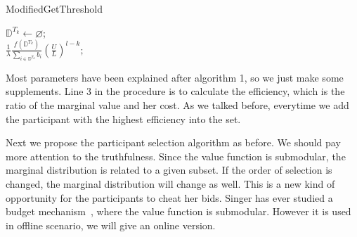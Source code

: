 \documentclass[conference,compsocconf,letterpaper,10pt]{IEEEtran}
\begin{document}
\begin{algorithm}
\BlankLine
{}
\caption{ModifiedGetThreshold}
\label{alg:GetThreshold}
\begin{small}
\BlankLine
$\mathbb{D}^{T_k}\leftarrow\varnothing$;\\
\Return $\frac{1}{\lambda}\frac{f(\mathbb{D}^{T_k})}{\sum_{i\in\mathbb{D}^{T_k}}b_i}\left(\frac{U}{L}\right)^{l-k};$
\end{small}
\end{algorithm}
Most parameters have been explained after algorithm 1, so we just make some supplements. Line 3 in the procedure is to calculate the efficiency, which is the ratio of the marginal value and her cost. As we talked before, everytime we add the participant with the highest efficiency into the set.

Next we propose the participant selection algorithm as before. We should pay more attention to the truthfulness. Since the value function is submodular, the marginal distribution is related to a given subset. If the order of selection is changed, the marginal distribution will change as well. This is a new kind of opportunity for the participants to cheat her bids. Singer has ever studied a budget mechanism~\cite{singer2010budget}, where the value function is submodular. However it is used in offline scenario, we will give an online version.
\end{document}
